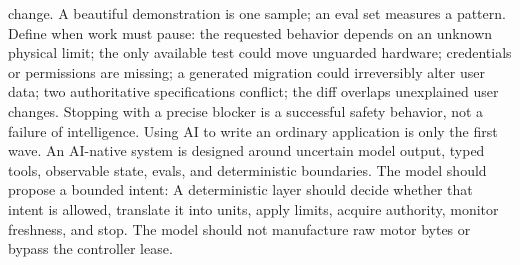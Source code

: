 {}change. A beautiful demonstration is one sample; an eval set measures a\markdownRendererSoftLineBreak
{}pattern.\markdownRendererInterblockSeparator
{}
\markdownRendererSectionEnd \markdownRendererSectionBegin
{}\markdownRendererInterblockSeparator
{}Define when work must pause:\markdownRendererInterblockSeparator
{}\markdownRendererUlBegin
\markdownRendererUlItem the requested behavior depends on an unknown physical limit;\markdownRendererUlItemEnd 
\markdownRendererUlItem the only available test could move unguarded hardware;\markdownRendererUlItemEnd 
\markdownRendererUlItem credentials or permissions are missing;\markdownRendererUlItemEnd 
\markdownRendererUlItem a generated migration could irreversibly alter user data;\markdownRendererUlItemEnd 
\markdownRendererUlItem two authoritative specifications conflict;\markdownRendererUlItemEnd 
\markdownRendererUlItem the diff overlaps unexplained user changes.\markdownRendererUlItemEnd 
\markdownRendererUlEnd \markdownRendererInterblockSeparator
{}Stopping with a precise blocker is a successful safety behavior, not a failure\markdownRendererSoftLineBreak
{}of intelligence.\markdownRendererInterblockSeparator
{}\markdownRendererThematicBreak{}\markdownRendererInterblockSeparator
{}
\markdownRendererSectionEnd 
\markdownRendererSectionEnd \markdownRendererSectionBegin
{}\markdownRendererInterblockSeparator
{}Using AI to write an ordinary application is only the first wave. An AI-native\markdownRendererSoftLineBreak
{}system is designed around uncertain model output, typed tools, observable\markdownRendererSoftLineBreak
{}state, evals, and deterministic boundaries.\markdownRendererInterblockSeparator
{}\markdownRendererSectionBegin
{}\markdownRendererInterblockSeparator
{}The model should propose a bounded intent:\markdownRendererInterblockSeparator
{}\markdownRendererInterblockSeparator
{}A deterministic layer should decide whether that intent is allowed, translate\markdownRendererSoftLineBreak
{}it into units, apply limits, acquire authority, monitor freshness, and stop.\markdownRendererSoftLineBreak
{}The model should not manufacture raw motor bytes or bypass the controller\markdownRendererSoftLineBreak
{}lease.\markdownRendererParagraphSeparator

